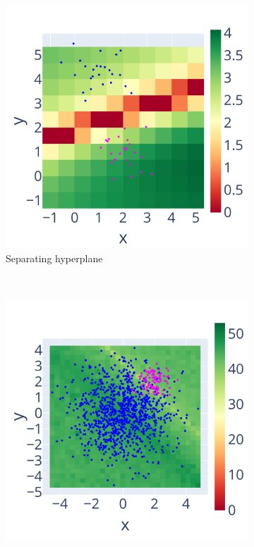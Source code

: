 \begin{figure}
    \centering
    \begin{subfigure}{.45\linewidth}
        \includegraphics[width=\linewidth]{figure/separating_hyperplan/hyperplane_zoom.pdf}
        \caption{Separating hyperplane}
        \label{fig:hyperplan_sig_zoom}
    \end{subfigure} \\
    \begin{subfigure}{.45\linewidth}
        \includegraphics[width=\linewidth]{figure/SVM/non_weighted.pdf}

\end{subfigure}
\end{figure}
